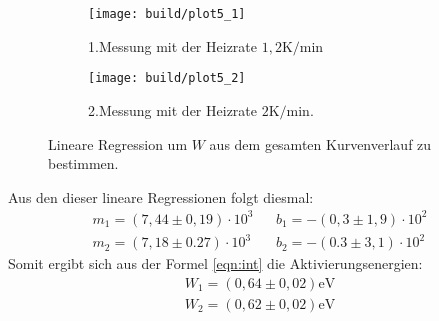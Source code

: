 \begin{figure}
  \centering
  \begin{subfigure}{0.48\textwidth}
    \centering
    \texttt{[image: build/plot5\_1]}
    \caption{1.Messung mit der Heizrate $1,2 \si{\kelvin\per\minute}$}
    \label{fig:intreg1}
  \end{subfigure}
  \begin{subfigure}{0.48\textwidth}
    \centering
    \texttt{[image: build/plot5\_2]}
    \caption{2.Messung mit der Heizrate $2 \si{\kelvin\per\minute}$.}
    \label{fig:intreg2}
  \end{subfigure}
\caption{Lineare Regression um $W$ aus dem gesamten Kurvenverlauf zu bestimmen.}
\label{fig:intreg}
\end{figure}

Aus den dieser lineare Regressionen folgt diesmal:
\begin{align*}
  m_1=(7,44\pm0,19)\cdot10^{3}    &  &b_1=-(0,3\pm1,9)\cdot10^{2}\\
  m_2=(7,18\pm0.27)\cdot10^{3}    &  &b_2=-(0.3\pm3,1)\cdot10^{2}
\end{align*}
Somit ergibt sich aus der Formel \eqref{eqn:int} die Aktivierungsenergien:
\begin{align*}
  W_1=(0,64\pm0,02)\si{\electronvolt}\\
  W_2=(0,62\pm0,02)\si{\electronvolt}
\end{align*}
